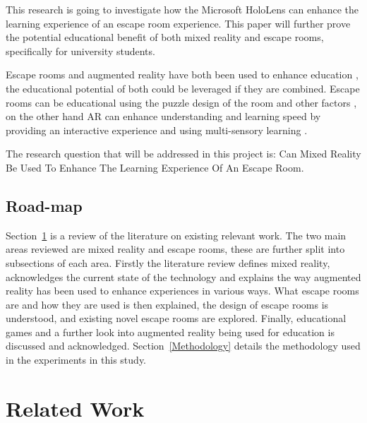 \documentclass[journal]{IEEEtran}
\begin{document}
This research is going to investigate how the Microsoft HoloLens can enhance the learning experience of an escape room experience. This paper will further prove the potential educational benefit of both mixed reality and escape rooms, specifically for university students. 

Escape rooms and augmented reality have both been used to enhance education \cite{clarke_escaped:_2017, kraut_improving_2015, billinghurst_augmented_nodate, shams_benefits_2008}, the educational potential of both could be leveraged if they are combined. Escape rooms can be educational using the puzzle design of the room and other factors \cite{clarke_escaped:_2017}, on the other hand AR can enhance understanding and learning speed by providing an interactive experience and using multi-sensory learning \cite{shams_benefits_2008, kraut_improving_2015}.

The research question that will be addressed in this project is: Can Mixed Reality Be Used To Enhance The Learning Experience Of An Escape Room. 

\subsection{Road-map}
	Section~\ref{RelatedWork} is a review of the literature on existing relevant work. The two main areas reviewed are mixed reality and escape rooms, these are further split into subsections of each area. Firstly the literature review defines mixed reality, acknowledges the current state of the technology and explains the way augmented reality has been used to enhance experiences in various ways. What escape rooms are and how they are used is then explained, the design of escape rooms is understood, and existing novel escape rooms are explored. Finally, educational games and a further look into augmented reality being used for education is discussed and acknowledged. 
	Section~\ref{Methodology} details the methodology used in the experiments in this study.

\section{Related Work} \label{RelatedWork}
\end{document}
